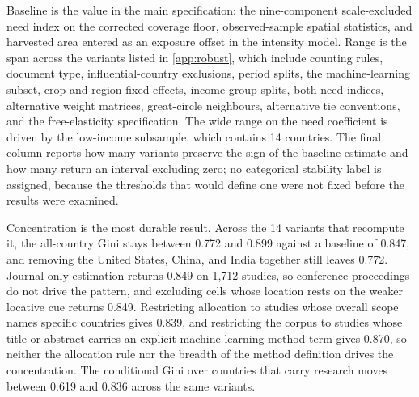 \documentclass[ASNA,twocolumn]{USG}
\begin{document}
\begin{table}[!t]
\begin{tablenotes}
\item[] Baseline is the value in the main specification: the nine-component scale-excluded need index on the corrected coverage floor, observed-sample spatial statistics, and harvested area entered as an exposure offset in the intensity model. Range is the span across the variants listed in \ref{app:robust}, which include counting rules, document type, influential-country exclusions, period splits, the machine-learning subset, crop and region fixed effects, income-group splits, both need indices, alternative weight matrices, great-circle neighbours, alternative tie conventions, and the free-elasticity specification. The wide range on the need coefficient is driven by the low-income subsample, which contains 14 countries. The final column reports how many variants preserve the sign of the baseline estimate and how many return an interval excluding zero; no categorical stability label is assigned, because the thresholds that would define one were not fixed before the results were examined.
\end{tablenotes}
\end{table}

Concentration is the most durable result. Across the 14 variants that recompute it, the
all-country Gini stays between 0.772 and 0.899 against a baseline of 0.847, and removing the
United States, China, and India together still leaves 0.772. Journal-only estimation returns
0.849 on 1,712 studies, so conference proceedings do not drive the pattern, and excluding
cells whose location rests on the weaker locative cue returns 0.849. Restricting allocation
to studies whose overall scope names specific countries gives 0.839, and restricting the
corpus to studies whose title or abstract carries an explicit machine-learning method term
gives 0.870, so neither the allocation rule nor the breadth of the method definition drives
the concentration. The conditional Gini over countries that carry research moves between
0.619 and 0.836 across the same variants.
\end{document}
